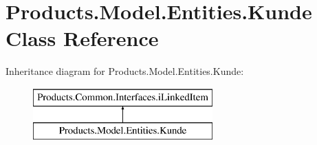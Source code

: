 \hypertarget{class_products_1_1_model_1_1_entities_1_1_kunde}{}\section{Products.\+Model.\+Entities.\+Kunde Class Reference}
\label{class_products_1_1_model_1_1_entities_1_1_kunde}
Inheritance diagram for Products.\+Model.\+Entities.\+Kunde\+:\begin{figure}[H]
\begin{center}
\leavevmode
\includegraphics[height=2.000000cm]{class_products_1_1_model_1_1_entities_1_1_kunde}
\end{center}
\end{figure}

